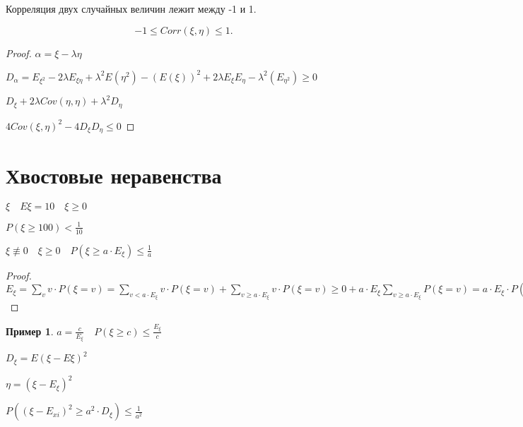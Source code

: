 \documentclass{book}
\theoremstyle{definition}
\newtheorem*{example}{Пример}
\begin{document}
\begin{theorem}
    Корреляция двух случайных величин лежит между -1 и 1.

    \[
        -1\leqslant Corr(\xi, \eta) \leqslant 1
    .\] 
\end{theorem}
\begin{proof}
    $\alpha = \xi-\lambda \eta$

    $D_{\alpha} = E_{\xi^2} - 2\lambda E_{\xi\eta} +\lambda^2 E\left(\eta^2  \right) - (E(\xi))^2 + 2\lambda E_{\xi}E_{\eta} - \lambda^2\left( E_{\eta^2} \right)\geqslant 0  $

    $D_{\xi} + 2\lambda Cov\left( \eta, \eta \right)  + \lambda^2D_{\eta}$

    $4Cov\left( \xi, \eta \right) ^2 - 4D_{\xi}D_{\eta}\leqslant 0$
\end{proof}

\section{Хвостовые неравенства}

$\xi\quad E\xi = 10\quad \xi \geqslant  0$

$P\left( \xi\geqslant 100 \right) <\frac{1}{10}$ 

\begin{theorem}

    $\xi \not\equiv 0\quad \xi\geqslant 0\quad P\left( \xi\geqslant a\cdot E_{\xi} \right) \leqslant \frac{1}{a}$
\end{theorem}
\begin{proof}
    $E_{\xi} = \sum_{v}v\cdot P\left( \xi = v \right) = \sum_{v< a\cdot E_{\xi}}v\cdot P\left( \xi = v \right) + \sum_{v \geqslant  a\cdot E_{\xi}}v\cdot P\left( \xi=v \right) \geqslant 0+a\cdot E_{\xi}\sum_{v\geqslant a\cdot E_{\xi}}P\left( \xi = v \right) = a\cdot E_{\xi}\cdot P\left( \xi\geqslant a\cdot E_{\xi} \right)  $
\end{proof}


\begin{example}
    $a = \frac{c}{E_{\xi}}\quad P\left( \xi\geqslant c \right) \leqslant \frac{E_{\xi}}{c}$
\end{example}



$D_{\xi} = E\left( \xi-E\xi \right) ^2$

$\eta = \left( \xi-E_{\xi} \right) ^2$

$P(\left( \xi - E_{xi} \right)^2 \geqslant a^2\cdot D_{\xi}) \leqslant \frac{1}{a^2}$
\end{document}
